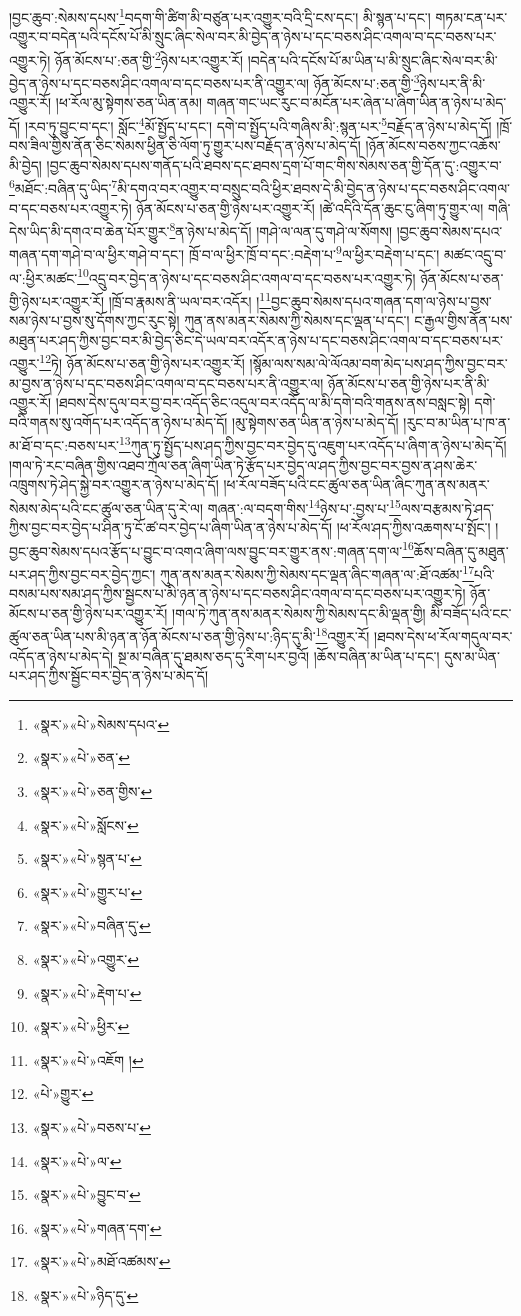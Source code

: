 །བྱང་ཆུབ་:སེམས་དཔས་\footnote{«སྣར་»«པེ་»སེམས་དཔའ་}བདག་གི་ཚིག་མི་བཙུན་པར་འགྱུར་བའི་དྲི་ངས་དང་། མི་སྙན་པ་དང་། གཏམ་ངན་པར་འགྱུར་བ་བདེན་པའི་དངོས་པོ་མི་སྲུང་ཞིང་སེལ་བར་མི་བྱེད་ན་ཉེས་པ་དང་བཅས་ཤིང་འགལ་བ་དང་བཅས་པར་འགྱུར་ཏེ། ཉོན་མོངས་པ་:ཅན་གྱི་\footnote{«སྣར་»«པེ་»ཅན་}ཉེས་པར་འགྱུར་རོ། །བདེན་པའི་དངོས་པོ་མ་ཡིན་པ་མི་སྲུང་ཞིང་སེལ་བར་མི་བྱེད་ན་ཉེས་པ་དང་བཅས་ཤིང་འགལ་བ་དང་བཅས་པར་ནི་འགྱུར་ལ། ཉོན་མོངས་པ་:ཅན་གྱི་\footnote{«སྣར་»«པེ་»ཅན་གྱིས་}ཉེས་པར་ནི་མི་འགྱུར་རོ། །ཕ་རོལ་མུ་སྟེགས་ཅན་ཡིན་ནམ། གཞན་གང་ཡང་རུང་བ་མངོན་པར་ཞེན་པ་ཞིག་ཡིན་ན་ཉེས་པ་མེད་དོ། །རབ་ཏུ་བྱུང་བ་དང་། སློང་\footnote{«སྣར་»«པེ་»སློངས་}མོ་སྤྱོད་པ་དང་། དགེ་བ་སྤྱོད་པའི་གཞིས་མི་:སྙན་པར་\footnote{«སྣར་»«པེ་»སྙན་པ་}བརྗོད་ན་ཉེས་པ་མེད་དོ། །ཁྲོ་བས་ཟིལ་གྱིས་ནོན་ཅིང་སེམས་ཕྱིན་ཅི་ལོག་ཏུ་གྱུར་པས་བརྗོད་ན་ཉེས་པ་མེད་དོ། །ཉོན་མོངས་བཅས་ཀྱང་འཆོས་མི་བྱེད། །བྱང་ཆུབ་སེམས་དཔས་གནོད་པའི་ཐབས་དང་ཐབས་དྲག་པོ་གང་གིས་སེམས་ཅན་གྱི་དོན་དུ་:འགྱུར་བ་\footnote{«སྣར་»«པེ་»གྱུར་པ་}མཐོང་:བཞིན་དུ་ཡིད་\footnote{«སྣར་»«པེ་»བཞིན་དུ་}མི་དགའ་བར་འགྱུར་བ་བསྲུང་བའི་ཕྱིར་ཐབས་དེ་མི་བྱེད་ན་ཉེས་པ་དང་བཅས་ཤིང་འགལ་བ་དང་བཅས་པར་འགྱུར་ཏེ། ཉོན་མོངས་པ་ཅན་གྱི་ཉེས་པར་འགྱུར་རོ། །ཚེ་འདིའི་དོན་ཆུང་ངུ་ཞིག་ཏུ་གྱུར་ལ། གཞི་དེས་ཡིད་མི་དགའ་བ་ཆེན་པོར་གྱུར་\footnote{«སྣར་»«པེ་»འགྱུར་}ན་ཉེས་པ་མེད་དོ། །གཤེ་ལ་ལན་དུ་གཤེ་ལ་སོགས། །བྱང་ཆུབ་སེམས་དཔའ་གཞན་དག་གཤེ་བ་ལ་ཕྱིར་གཤེ་བ་དང་། ཁྲོ་བ་ལ་ཕྱིར་ཁྲོ་བ་དང་:བརྡེག་པ་\footnote{«སྣར་»«པེ་»རྡེག་པ་}ལ་ཕྱིར་བརྡེག་པ་དང་། མཚང་འདྲུ་བ་ལ་:ཕྱིར་མཚང་\footnote{«སྣར་»«པེ་»ཕྱིར་}འདྲུ་བར་བྱེད་ན་ཉེས་པ་དང་བཅས་ཤིང་འགལ་བ་དང་བཅས་པར་འགྱུར་ཏེ། ཉོན་མོངས་པ་ཅན་གྱི་ཉེས་པར་འགྱུར་རོ། །ཁྲོ་བ་རྣམས་ནི་ཡལ་བར་འདོར། །\footnote{«སྣར་»«པེ་»འཇོག །}བྱང་ཆུབ་སེམས་དཔའ་གཞན་དག་ལ་ཉེས་པ་བྱས་སམ་ཉེས་པ་བྱས་སུ་དོགས་ཀྱང་རུང་སྟེ། ཀུན་ནས་མནར་སེམས་ཀྱི་སེམས་དང་ལྡན་པ་དང་། ང་རྒྱལ་གྱིས་ནོན་པས་མཐུན་པར་ཤད་ཀྱིས་བྱང་བར་མི་བྱེད་ཅིང་དེ་ཡལ་བར་འདོར་ན་ཉེས་པ་དང་བཅས་ཤིང་འགལ་བ་དང་བཅས་པར་འགྱུར་\footnote{«པེ་»གྱུར་}ཏེ། ཉོན་མོངས་པ་ཅན་གྱི་ཉེས་པར་འགྱུར་རོ། །སྙོམ་ལས་སམ་ལེ་ལོའམ་བག་མེད་པས་ཤད་ཀྱིས་བྱང་བར་མ་བྱས་ན་ཉེས་པ་དང་བཅས་ཤིང་འགལ་བ་དང་བཅས་པར་ནི་འགྱུར་ལ། ཉོན་མོངས་པ་ཅན་གྱི་ཉེས་པར་ནི་མི་འགྱུར་རོ། །ཐབས་དེས་དུལ་བར་བྱ་བར་འདོད་ཅིང་འདུལ་བར་འདོད་ལ་མི་དགེ་བའི་གནས་ནས་བསླང་སྟེ། དགེ་བའི་གནས་སུ་འགོད་པར་འདོད་ན་ཉེས་པ་མེད་དོ། །མུ་སྟེགས་ཅན་ཡིན་ན་ཉེས་པ་མེད་དོ། །རུང་བ་མ་ཡིན་པ་ཁ་ན་མ་ཐོ་བ་དང་:བཅས་པར་\footnote{«སྣར་»«པེ་»བཅས་པ་}ཀུན་ཏུ་སྤྱོད་པས་ཤད་ཀྱིས་བྱང་བར་བྱེད་དུ་འཇུག་པར་འདོད་པ་ཞིག་ན་ཉེས་པ་མེད་དོ། །གལ་ཏེ་རང་བཞིན་གྱིས་འཐབ་ཀྲོལ་ཅན་ཞིག་ཡིན་ཏེ་རྩོད་པར་བྱེད་ལ་ཤད་ཀྱིས་བྱང་བར་བྱས་ན་ཤས་ཆེར་འཁྲུགས་ཏེ་ཤེད་སྐྱེ་བར་འགྱུར་ན་ཉེས་པ་མེད་དོ། །ཕ་རོལ་བཟོད་པའི་ངང་ཚུལ་ཅན་ཡིན་ཞིང་ཀུན་ནས་མནར་སེམས་མེད་པའི་ངང་ཚུལ་ཅན་ཡིན་དུ་རེ་ལ། གཞན་:ལ་བདག་གིས་\footnote{«སྣར་»«པེ་»ལ་}ཉེས་པ་:བྱས་པ་\footnote{«སྣར་»«པེ་»བྱུང་བ་}ལས་བརྩམས་ཏེ་ཤད་ཀྱིས་བྱང་བར་བྱེད་པ་ཤིན་ཏུ་ངོ་ཚ་བར་བྱེད་པ་ཞིག་ཡིན་ན་ཉེས་པ་མེད་དོ། །ཕ་རོལ་ཤད་ཀྱིས་འཆགས་པ་སྤོང་། །བྱང་ཆུབ་སེམས་དཔའ་རྩོད་པ་བྱུང་བ་འགའ་ཞིག་ལས་བྱུང་བར་གྱུར་ནས་:གཞན་དག་ལ་\footnote{«སྣར་»«པེ་»གཞན་དག་}ཆོས་བཞིན་དུ་མཐུན་པར་ཤད་ཀྱིས་བྱང་བར་བྱེད་ཀྱང་། ཀུན་ནས་མནར་སེམས་ཀྱི་སེམས་དང་ལྡན་ཞིང་གཞན་ལ་:ཐོ་འཚམ་\footnote{«སྣར་»«པེ་»མཐོ་འཚམས་}པའི་བསམ་པས་སམ་ཤད་ཀྱིས་སྦྱངས་པ་མི་ཉན་ན་ཉེས་པ་དང་བཅས་ཤིང་འགལ་བ་དང་བཅས་པར་འགྱུར་ཏེ། ཉོན་མོངས་པ་ཅན་གྱི་ཉེས་པར་འགྱུར་རོ། །གལ་ཏེ་ཀུན་ནས་མནར་སེམས་ཀྱི་སེམས་དང་མི་ལྡན་གྱི། མི་བཟོད་པའི་ངང་ཚུལ་ཅན་ཡིན་པས་མི་ཉན་ན་ཉོན་མོངས་པ་ཅན་གྱི་ཉེས་པ་:ཉིད་དུ་མི་\footnote{«སྣར་»«པེ་»ཉིད་དུ་}འགྱུར་རོ། །ཐབས་དེས་ཕ་རོལ་གདུལ་བར་འདོད་ན་ཉེས་པ་མེད་དེ། སྔ་མ་བཞིན་དུ་ཐམས་ཅད་དུ་རིག་པར་བྱའོ། །ཆོས་བཞིན་མ་ཡིན་པ་དང་། དུས་མ་ཡིན་པར་ཤད་ཀྱིས་སྦྱོང་བར་བྱེད་ན་ཉེས་པ་མེད་དོ། 